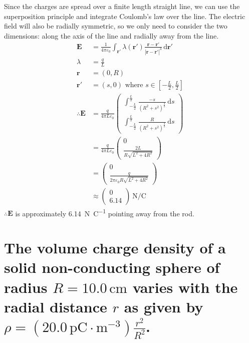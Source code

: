 \documentclass[a4paper]{scrartcl}
\begin{document}
Since the charges are spread over a finite length straight line, we can use the superposition principle and integrate Coulomb's law over the line. The electric field will also be radially symmetric, so we only need to consider the two dimensions: along the axis of the line and radially away from the line.
\begin{align*}
    \mathbf{E} &= \frac{1}{4 \pi \varepsilon_0} \int_{\mathbf{r'}} \lambda(\mathbf{r'}) \frac{\mathbf{r} - \mathbf{r'}}{|\mathbf{r} - \mathbf{r'}|^3} \, \mathrm{d}\mathbf{r'} \\
    \lambda &= \frac{q}{L} \\
    \mathbf{r} &= (0, R) \\
    \mathbf{r'} &= (s, 0) \text{ where } s \in \left[-\frac{L}{2}, \frac{L}{2}\right] \\
    \therefore \mathbf{E} &= \frac{q}{4 \pi L \varepsilon_0} \begin{pmatrix}
        \int_{-\frac{L}{2}}^{\frac{L}{2}} \frac{-s}{(R^2 + s^2)^{\frac32}} \, \mathrm{d}s \\
        \int_{-\frac{L}{2}}^{\frac{L}{2}} \frac{R}{(R^2 + s^2)^{\frac32}} \, \mathrm{d}s
    \end{pmatrix} \\
    &= \frac{q}{4 \pi L \varepsilon_0} \begin{pmatrix}
        0 \\
        \frac{2 L}{R \sqrt{L^2 + 4 R^2}}
    \end{pmatrix} \\
    &= \begin{pmatrix}
        0 \\
        \frac{q}{2 \pi \varepsilon_0 R \sqrt{L^2 + 4 R^2}}
    \end{pmatrix} \\
    &\approx \begin{pmatrix}
        0 \\
        6.14
    \end{pmatrix}\SI{}{\newton\per\coulomb}
\end{align*}
\(\therefore \mathbf{E}\) is approximately \SI{6.14}{\newton\per\coulomb} pointing away from the rod.

\section{The volume charge density of a solid non-conducting sphere of radius \(R = 10.0\,\mathrm{cm}\) varies with the radial distance \(r\) as given by \(\rho = (20.0\,\mathrm{pC \cdot m^{-3}})\frac{r^2}{R^2}\).}
\end{document}
